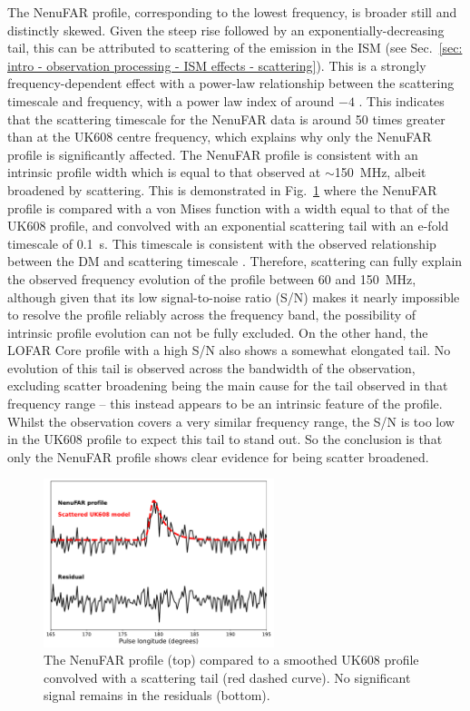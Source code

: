 The NenuFAR profile, corresponding to the lowest frequency, is broader still and distinctly skewed. Given the steep rise followed by an exponentially-decreasing tail, this can be attributed to scattering of the emission in the ISM (see Sec.~\ref{sec: intro - observation processing - ISM effects - scattering}). This is a strongly frequency-dependent effect with a power-law relationship between the scattering timescale and frequency, with a power law index of around $-4$ \citep{SDOx1980,PulsarAstronomy, GKK+2017}. This indicates that the scattering timescale for the NenuFAR data is around 50 times greater than at the UK608 centre frequency, which explains why only the NenuFAR profile is significantly affected. The NenuFAR profile is consistent with an intrinsic profile width which is equal to that observed at $\sim$150~MHz, albeit broadened by scattering. This is demonstrated in Fig.~\ref{fig: J0250 - nenufar scattering} where the NenuFAR profile is compared with a von Mises function with a width equal to that of the UK608 profile, and convolved with an exponential scattering tail with an e-fold timescale of 0.1~s. This timescale is consistent with the observed relationship between the DM and scattering timescale \citep[e.g.][]{BCC+2004,IJWx2019}. Therefore, scattering can fully explain the observed frequency evolution of the profile between 60 and 150~MHz, although given that its low signal-to-noise ratio (S/N) makes it nearly impossible to resolve the profile reliably across the frequency band, the possibility of intrinsic profile evolution can not be fully excluded. On the other hand, the LOFAR Core profile with a high S/N also shows a somewhat elongated tail. No evolution of this tail is observed across the bandwidth of the observation, excluding scatter broadening being the main cause for the tail observed in that frequency range -- this instead appears to be an intrinsic feature of the profile. Whilst the observation covers a very similar frequency range, the S/N is too low in the UK608 profile to expect this tail to stand out. So the conclusion is that only the NenuFAR profile shows clear evidence for being scatter broadened.
\begin{figure}
    \begin{center}
        \includegraphics[width=0.6\textwidth]{Figures/J0250/nenufar_scattering}
        \caption[Evidence for scattering in the NenuFAR profile of PSR~J0250+5854]{The NenuFAR profile (top) compared to a smoothed UK608 profile convolved with a scattering tail (red dashed curve). No significant signal remains in the residuals (bottom).}
        \label{fig: J0250 - nenufar scattering}
    \end{center}
\end{figure}

